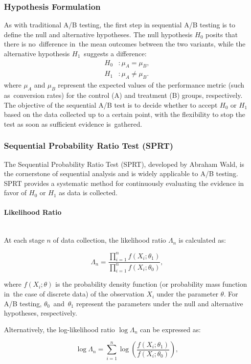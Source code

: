 \documentclass[magisterska, english]{pwr_wmat_praca_dyplomowa}
\theoremstyle{plain}
\numberwithin{theorem}{chapter}
\theoremstyle{definition}
\numberwithin{theorem}{chapter}
\newcommand{\myparagraph}[1]{\paragraph{#1}\mbox{}\\}
\begin{document}
\subsubsection{Hypothesis Formulation}
As with traditional A/B testing, the first step in sequential A/B testing is to define the null and alternative hypotheses. The null hypothesis \( H_0 \) posits that there is no~difference in~the mean outcomes between the two variants, while the alternative hypothesis \( H_1 \)~suggests a difference:
\begin{align*}
	H_0 &: \mu_A = \mu_B, \\
	H_1 &: \mu_A \neq \mu_B.
\end{align*}
where \( \mu_A \) and \( \mu_B \) represent the expected values of the performance metric (such as~conversion rates) for the control (A) and treatment (B) groups, respectively. The objective of the sequential A/B test is to decide whether to accept \( H_0 \) or \( H_1 \) based on the data collected up to a certain point, with the flexibility to stop the test as soon as sufficient evidence is~gathered.

\subsubsection{Sequential Probability Ratio Test (SPRT)}

The Sequential Probability Ratio Test (SPRT), developed by Abraham Wald, is the cornerstone of sequential analysis and is widely applicable to A/B testing. SPRT provides a systematic method for continuously evaluating the evidence in favor of \( H_0 \) or \( H_1 \) as data is collected.

\myparagraph{Likelihood Ratio}

At each stage \( n \) of data collection, the likelihood ratio \( \Lambda_n \) is calculated as:

\[
\Lambda_n = \frac{\prod_{i=1}^{n} f(X_i; \theta_1)}{\prod_{i=1}^{n} f(X_i; \theta_0)},
\]

where \( f(X_i; \theta) \) is the probability density function (or probability mass function in~the case of discrete data) of the observation \( X_i \) under the parameter \( \theta \). For A/B testing, \( \theta_0 \)~and~\( \theta_1 \) represent the parameters under the null and alternative hypotheses, respectively.

Alternatively, the log-likelihood ratio \( \log \Lambda_n \) can be expressed as:

\[
\log \Lambda_n = \sum_{i=1}^{n} \log \left(\frac{f(X_i; \theta_1)}{f(X_i; \theta_0)}\right),
\]
\end{document}
